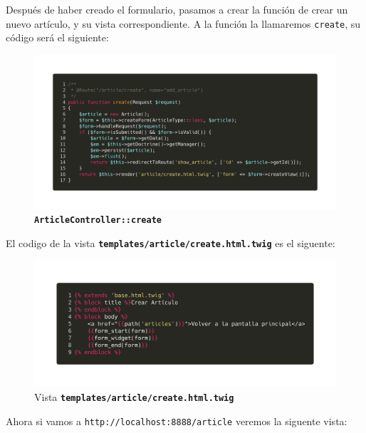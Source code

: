 Después de haber creado el formulario, pasamos a crear la función de crear un nuevo artículo, y su vista correspondiente.
\clearpage
A la función la llamaremos \texttt{create}, su código será el siguiente:
\begin{figure}[ht]
  \centering
  \includegraphics[width=\textwidth]{../assets/article_create_form.png}
  \caption{\texttt{\textbf{ArticleController::create}}}
  \label{fig:article_create_form}
\end{figure}

El codigo de la vista \texttt{\textbf{templates/article/create.html.twig}} es el siguente:

\begin{figure}[ht]
  \centering
  \includegraphics[width=\textwidth]{../assets/form_article_twig.png}
  \caption{Vista \texttt{\textbf{templates/article/create.html.twig}}}
  \label{fig:form_article_twig}
\end{figure}

\clearpage
Ahora si vamos a \texttt{http://localhost:8888/article} veremos la siguente vista:

